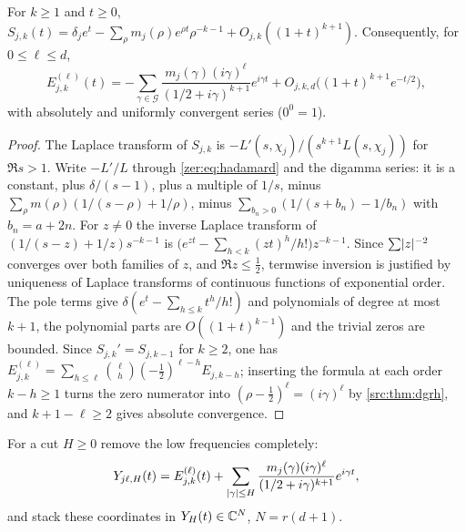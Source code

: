 \begin{lemma}\label{zer:lem:riesz}
For $k\ge1$ and $t\ge0$,
$S_{j,k}(t)=\delta_je^t-\sum_\rho m_j(\rho)e^{\rho t}\rho^{-k-1}+O_{j,k}((1+t)^{k+1})$. Consequently,
for $0\le\ell\le d$,
\begin{equation}\label{zer:eq:jetexp}
 E_{j,k}^{(\ell)}(t)=-\sum_{\gamma\in\mathcal G}\frac{m_j(\gamma)(i\gamma)^\ell}{(1/2+i\gamma)^{k+1}}e^{i\gamma t}
 +O_{j,k,d}\bigl((1+t)^{k+1}e^{-t/2}\bigr),
\end{equation}
with absolutely and uniformly convergent series ($0^0=1$).
\end{lemma}
\begin{proof}
The Laplace transform of $S_{j,k}$ is $-L'(s,\chi_j)/(s^{k+1}L(s,\chi_j))$ for $\Re s>1$. Write
$-L'/L$ through \eqref{zer:eq:hadamard} and the digamma series: it is a constant, plus
$\delta/(s-1)$, plus a multiple of $1/s$, minus $\sum_\rho m(\rho)(1/(s-\rho)+1/\rho)$, minus
$\sum_{b_n>0}(1/(s+b_n)-1/b_n)$ with $b_n=a+2n$. For $z\ne0$ the inverse Laplace transform of
$(1/(s-z)+1/z)s^{-k-1}$ is $\bigl(e^{zt}-\sum_{h<k}(zt)^h/h!\bigr)z^{-k-1}$. Since
$\sum\lvert z\rvert^{-2}$ converges over both families of $z$, and $\Re z\le\tfrac12$, termwise inversion
is justified by uniqueness of Laplace transforms of continuous functions of exponential
order. The pole terms give $\delta(e^t-\sum_{h\le k}t^h/h!)$ and polynomials of degree at most
$k+1$, the polynomial parts are $O((1+t)^{k-1})$ and the trivial zeros are bounded. Since
$S_{j,k}'=S_{j,k-1}$ for $k\ge2$, one has
$E_{j,k}^{(\ell)}=\sum_{h\le\ell}\binom\ell h(-\tfrac12)^{\ell-h}E_{j,k-h}$; inserting the formula
at each order $k-h\ge1$ turns the zero numerator into $(\rho-\tfrac12)^\ell=(i\gamma)^\ell$ by
\cref{src:thm:dgrh}, and $k+1-\ell\ge2$ gives absolute convergence.
\end{proof}

For a cut $H\ge0$ remove the low frequencies completely:
\[
 Y_{j\ell,H}(t)=E_{j,k}^{(\ell)}(t)+\sum_{\lvert\gamma\rvert\le H}
 \frac{m_j(\gamma)(i\gamma)^\ell}{(1/2+i\gamma)^{k+1}}e^{i\gamma t},
\]
and stack these coordinates in $Y_H(t)\in\mathbb{C}^N$, $N=r(d+1)$.

